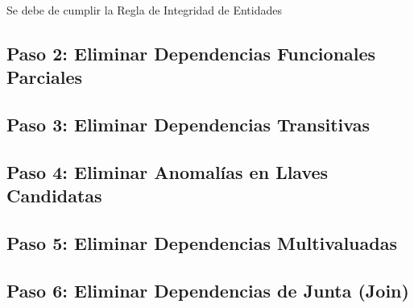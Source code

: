 \documentclass[12pt, fleqn]{report}                             %
\begin{document}
                Se debe de cumplir la Regla de Integridad de Entidades

            \clearpage
            \subsection{Paso 2: Eliminar Dependencias Funcionales Parciales}


            \clearpage
            \subsection{Paso 3: Eliminar Dependencias Transitivas}



            \clearpage
            \subsection{Paso 4: Eliminar Anomalías en Llaves Candidatas}



            \clearpage
            \subsection{Paso 5: Eliminar Dependencias Multivaluadas}


            \clearpage
            \subsection{Paso 6: Eliminar Dependencias de Junta (Join)}



                
\end{document}
